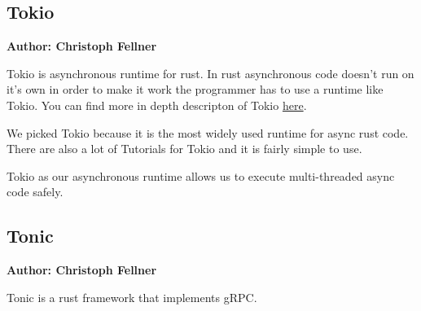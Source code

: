 \subsection{Tokio}
\textbf{Author: Christoph Fellner}

Tokio is asynchronous runtime for rust. In rust asynchronous code doesn't run on it's own in order to make it work the programmer has to use a runtime like Tokio. You can find more in depth descripton of Tokio \href{https://tokio.rs/tokio/tutorial}{here}. 

We picked Tokio because it is the most widely used runtime for async rust code. There are also a lot of Tutorials for Tokio and it is fairly simple to use.

Tokio as our asynchronous runtime allows us to execute multi-threaded async code safely.  

\subsection{Tonic}
\textbf{Author: Christoph Fellner}

Tonic is a rust framework that implements gRPC.

\filbreak
